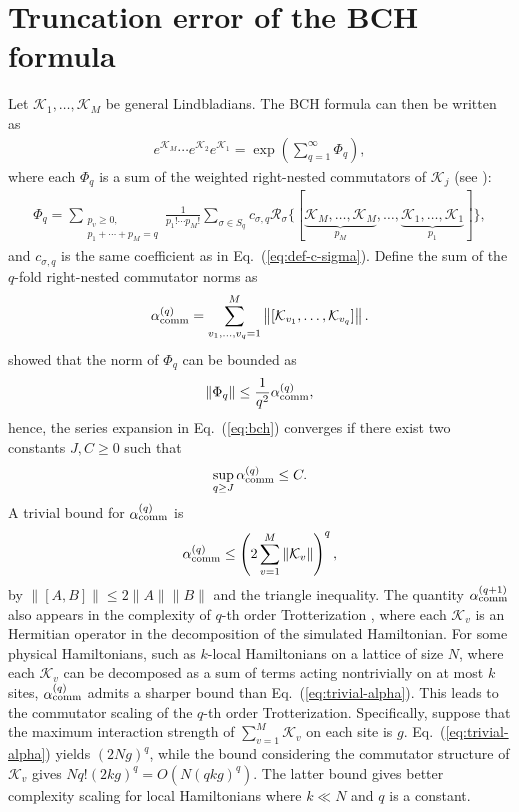 \documentclass[11pt]{article}
\newcommand{\eq}[1]{(\ref{eq:#1})}
\newcommand{\mc}{\mathcal}
\begin{document}
\section{Truncation error of the BCH formula}
\label{sec:bch-truncate}
Let $\mc K_1, \ldots, \mc K_M$ be general Lindbladians. The BCH formula can then be written as
\begin{align}
\label{eq:def-bch}
 	e^{\mc K_M}\cdots e^{\mc K_2}e^{\mc K_1} = \exp(\sum_{q = 1}^{\infty} \Phi_q),
\end{align}
where each $\Phi_q$ is a sum of the weighted right-nested commutators of $\mc K_j$ (see \citet{arnal2021note}):
\begin{align}
\label{eq:bch}
 	\Phi_q = \sum_{\substack{p_v \ge 0,\\p_1+\cdots+p_M = q}}\frac{1}{p_1!\cdots p_M!} \sum_{\sigma\in S_q} c_{\sigma, q}\mc R_{\sigma}\{[\underbrace{\mc K_M, \ldots, \mc K_M}_{p_M}, \ldots, \underbrace{\mc K_1, \ldots, \mc K_1}_{p_1}]\},
\end{align}
and $c_{\sigma,q}$ is the same coefficient as in Eq.~\eq{def-c-sigma}. Define the sum of the $q$-fold right-nested commutator norms as
\begin{align}
\label{eq:def-comm}
 	\alpha_{\rm comm}^{(q)} =\sum_{v_1, \ldots, v_q = 1}^{M} \left\|[\mc K_{v_1}, \ldots, \mc K_{v_q}]\right\|.
\end{align}
\citet{aftab2024multi} showed that the norm of $\Phi_q$ can be bounded as
\begin{align*}
 	\|\Phi_q\|\le \frac{1}{q^2} 	\alpha_{\rm comm}^{(q)},
\end{align*}
hence, the series expansion in Eq.~\eq{bch} converges if there exist two constants $J,C\ge 0$ such that
\begin{align}
\label{eq:converg-bch}
 	\sup_{q\ge J}\alpha_{\rm comm}^{(q)} \le C.
\end{align} 
A trivial bound for $\alpha_{\rm comm}^{(q)}$ is
\begin{align}
\label{eq:trivial-alpha}
 	\alpha_{\rm comm}^{(q)} \le \left(2\sum_{v = 1}^M \|\mc K_v\|\right)^q,
\end{align}
by $\|[A,B]\|\le 2\|A\|\|B\|$ and the triangle inequality. The quantity $\alpha_{\rm comm}^{(q+1)}$ also appears in the complexity of $q$-th order Trotterization \cite{childs2021theory}, where each $\mc K_v$ is an Hermitian operator in the decomposition of the simulated Hamiltonian. For some physical Hamiltonians, such as $k$-local Hamiltonians on a lattice of size $N$, where each $\mc K_v$ can be decomposed as a sum of terms acting nontrivially on at most $k$ sites, $\alpha_{\rm comm}^{(q)}$ admits a sharper bound than Eq.~\eq{trivial-alpha}. This leads to the commutator scaling of the $q$-th order Trotterization. Specifically, suppose that the maximum interaction strength of $\sum_{v = 1}^M \mc K_v$ on each site is $g$. Eq.~\eq{trivial-alpha} yields $(2Ng)^q$, while the bound considering the commutator structure of $\mc K_v$ gives $Nq!(2kg)^q = O(N(qkg)^q)$. The latter bound gives better complexity scaling for local Hamiltonians where $k\ll N$ and $q$ is a constant. 
\end{document}
